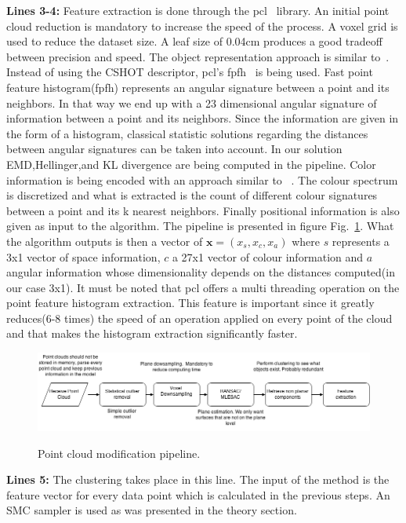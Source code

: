 \documentclass[twoside,hidelinks]{article}
\begin{document}
\textbf{Lines 3-4:} Feature extraction is done through the pcl~\cite{pcl} library. An initial point cloud reduction is mandatory to increase the speed of the process. A voxel grid is used to reduce the dataset size. A leaf size of 0.04cm produces a good tradeoff between precision and speed. The object representation approach is similar to~\cite{objectpointslam}. Instead of using the CSHOT descriptor, pcl's fpfh~\cite{fpfh} is being used. Fast point feature histogram(fpfh) represents an angular signature between a point and its neighbors. In that way we end up with a 23 dimensional angular signature of information between a point and its neighbors. Since the information are given in the form of a histogram, classical statistic solutions regarding the distances between angular signatures can be taken into account. In our solution EMD,Hellinger,and KL divergence are being computed in the pipeline. Color information is being encoded with an approach similar to ~\cite{smcddp}. The colour spectrum is discretized and what is extracted is the count of different colour signatures between a point and its k nearest neighbors. Finally positional information is also given as input to the algorithm. The pipeline is presented in figure Fig.~\ref{pcl:mod}. What the algorithm outputs is then a vector of $ \textbf{x} = (x_s, x_c, x_a) $ where $s$ represents a 3x1 vector of space information, $c$ a 27x1 vector of colour information and $a$ angular information whose dimensionality depends on the distances computed(in our case 3x1). It must be noted that pcl offers a multi threading operation on the point feature histogram extraction. This feature is important since it greatly reduces(6-8 times) the speed of an operation applied on every point of the cloud and that makes the histogram extraction significantly faster.

\begin{figure}[h!]
  \caption{Point cloud modification pipeline.}
  \centering
    \includegraphics[width=1\textwidth]{Basic}
  \label{pcl:mod}
\end{figure}

\textbf{Lines 5:} The clustering takes place in this line. The input of the method is the feature vector for every data point which is calculated in the previous steps. An SMC sampler is used as was presented in the theory section. 
\end{document}
